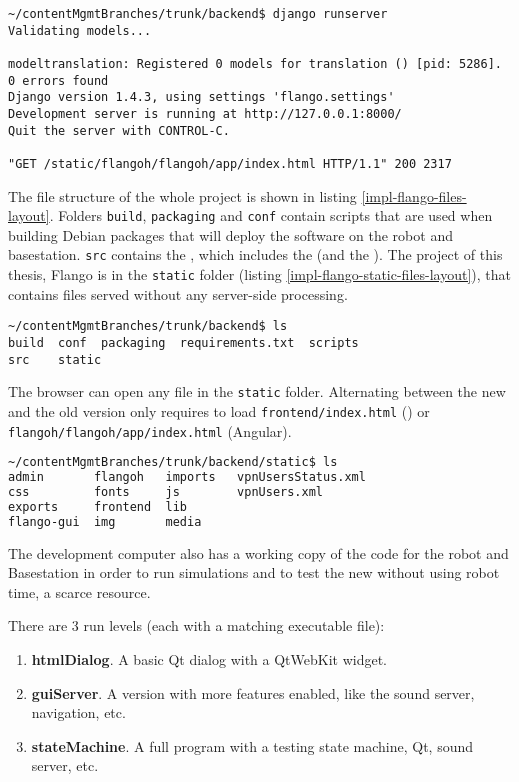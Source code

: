 \begin{lstlisting}[caption=Django web server, label=virtual-env-server]
~/contentMgmtBranches/trunk/backend$ django runserver
Validating models...

modeltranslation: Registered 0 models for translation () [pid: 5286].
0 errors found
Django version 1.4.3, using settings 'flango.settings'
Development server is running at http://127.0.0.1:8000/
Quit the server with CONTROL-C.

"GET /static/flangoh/flangoh/app/index.html HTTP/1.1" 200 2317
\end{lstlisting}

The file structure of the whole project is shown in listing \ref{impl-flango-files-layout}.
Folders \texttt{build}, \texttt{packaging} and \texttt{conf} contain scripts that are used when building Debian packages that will deploy the software on the robot and basestation.
\texttt{src} contains the \flangobe , which includes the \flangofe (and the \se).
The project of this thesis, Flango \cm is in the \texttt{static} folder (listing \ref{impl-flango-static-files-layout}), that contains files served without any server-side processing.

\begin{lstlisting}[columns=fixed,caption=Flango files layout, label=impl-flango-files-layout]
~/contentMgmtBranches/trunk/backend$ ls
build  conf  packaging  requirements.txt  scripts
src    static
\end{lstlisting}

The browser can open any file in the \texttt{static} folder.
Alternating between the new and the old version only requires to load \texttt{frontend/index.html} (\flash) or \\ \texttt{flangoh/flangoh/app/index.html} (Angular).

\begin{lstlisting}[columns=fixed,language=bash,caption=Flango static files layout, label=impl-flango-static-files-layout]
~/contentMgmtBranches/trunk/backend/static$ ls
admin       flangoh   imports   vpnUsersStatus.xml
css         fonts     js        vpnUsers.xml
exports     frontend  lib
flango-gui  img       media
\end{lstlisting}

The development computer also has a working copy of the code for the robot and Basestation in order to run simulations and to test the new \cm  without using robot time, a scarce resource.

There are 3 run levels (each with a matching executable file):
\begin{enumerate}
\item \textbf{htmlDialog}. A basic Qt dialog with a QtWebKit widget.
\item \textbf{guiServer}. A version with more features enabled, like the sound server, navigation, etc.
\item \textbf{stateMachine}. A full program with a testing state machine, Qt, sound server, etc.
\end{enumerate}


